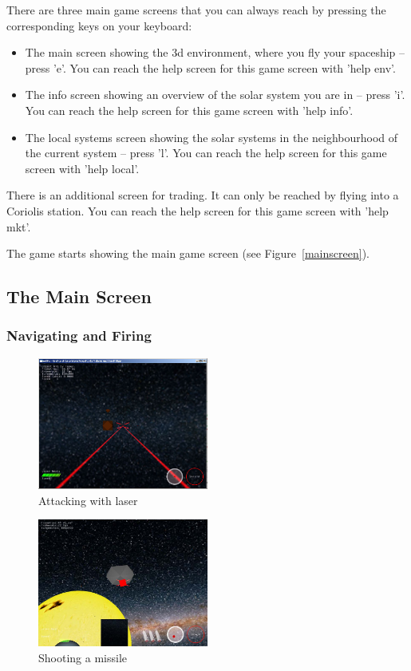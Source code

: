 \documentclass[a4paper,11pt]{article}
\begin{document}
There are three main game screens that you can always reach by pressing the corresponding keys on your keyboard: 
\begin{itemize}
\item The main screen showing the 3d environment, where you fly your spaceship -- press 'e'.
      You can reach the help screen for this game screen with 'help env'.
\item The info screen showing an overview of the solar system you are in -- press 'i'.
      You can reach the help screen for this game screen with 'help info'.
\item The local systems screen showing the solar systems in the neighbourhood of the current system -- press 'l'. 
      You can reach the help screen for this game screen with 'help local'.
\end{itemize}
There is an additional screen for trading. It can only be reached by flying into a Coriolis station. You can reach the help screen for this game screen with 'help mkt'.

The game starts showing the main game screen (see Figure~\ref{mainscreen}).

\subsection{The Main Screen}

\subsubsection{Navigating and Firing}

\begin{figure}[ht]
	\centering
		\includegraphics[width=0.50\textwidth]{laser.jpg}
		\caption{Attacking with laser\label{laser}}
\end{figure}

\begin{figure}[ht]
        \centering
        \includegraphics[width=0.50\textwidth]{missile.jpg} %
        \caption{Shooting a missile\label{missile}}
\end{figure}
\end{document}
